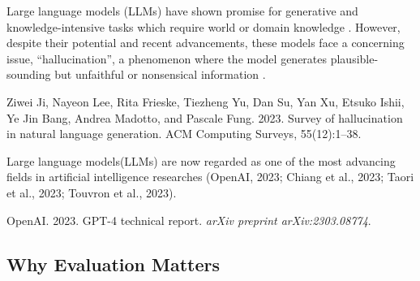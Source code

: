 Large language models (LLMs) have shown promise for generative and knowledge-intensive tasks which require world or domain knowledge \cite{petroni2021kilt_LR}.  However, despite their potential and recent advancements, these models face a concerning issue, “hallucination”, a phenomenon where the model generates plausible-sounding but unfaithful or nonsensical information \cite{ji2023survey}.

 Ziwei Ji, Nayeon Lee, Rita Frieske, Tiezheng Yu, Dan Su, Yan Xu, Etsuko Ishii, Ye Jin Bang, Andrea Madotto, and Pascale Fung. 2023. Survey of hallucination in natural language generation. ACM Computing Surveys, 55(12):1–38.

Large language models(LLMs) are now regarded as one of the most advancing fields in artificial intelligence researches (OpenAI, 2023; Chiang et al., 2023; Taori et al., 2023; Touvron et al., 2023).

OpenAI. 2023. GPT-4 technical report. \textit{arXiv preprint arXiv:2303.08774}.



\subsection{Why Evaluation Matters}
